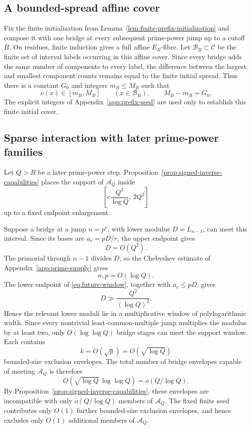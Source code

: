 \subsection{A bounded-spread affine cover}

Fix the finite initialization from Lemma~\ref{lem:finite-prefix-initialization} and compose it with one bridge at every subsequent prime-power jump up to a cutoff $B$.  On residues, finite induction gives a full affine $E_B$-fibre.  Let $\mathcal B_B\subset\mathcal C$ be the finite set of interval labels occurring in this affine cover.  Since every bridge adds the same number of components to every label, the difference between the largest and smallest component counts remains equal to the finite initial spread.  Thus there is a constant $G_0$ and integers $m_B\le M_B$ such that
\begin{equation}\label{eq:ragged-spread}
\nu(x)\in[m_B,M_B]
\qquad(x\in\mathcal B_B),
\qquad
M_B-m_B=G_0.
\end{equation}
The explicit integers of Appendix~\ref{app:prefix-seed} are used only to establish this finite initial cover.

\subsection{Sparse interaction with later prime-power families}

Let $Q>B$ be a later prime-power step.  Proposition~\ref{prop:signed-inverse-capabilities} places the support of $\mathcal A_Q$ inside
\begin{equation}\label{eq:future-window}
\left[c\frac{Q^2}{\log Q},\,2Q^2\right]
\end{equation}
up to a fixed endpoint enlargement.

Suppose a bridge at a jump $n=p^e$, with lower modulus $D=L_{n-1}$, can meet this interval.  Since its bases are $a_r=pD/r$, the upper endpoint gives
\[
D=O(Q^2).
\]
The primorial through $n-1$ divides $D$, so the Chebyshev estimate of Appendix~\ref{app:prime-supply} gives
\[
n,p=O(\log Q).
\]
The lower endpoint of \eqref{eq:future-window}, together with $a_r\le pD$, gives
\[
D\gg\frac{Q^2}{(\log Q)^2}.
\]
Hence the relevant lower moduli lie in a multiplicative window of polylogarithmic width.  Since every nontrivial least-common-multiple jump multiplies the modulus by at least two, only $O(\log\log Q)$ bridge stages can meet the support window.  Each contains
\[
k=O(\sqrt p)=O(\sqrt{\log Q})
\]
bounded-size exclusion envelopes.  The total number of bridge envelopes capable of meeting $\mathcal A_Q$ is therefore
\begin{equation}\label{eq:bridge-footprint}
O(\sqrt{\log Q}\,\log\log Q)
=o(Q/\log Q).
\end{equation}
By Proposition~\ref{prop:signed-inverse-capabilities}, these envelopes are incompatible with only $o(Q/\log Q)$ members of $\mathcal A_Q$.  The fixed finite seed contributes only $O(1)$ further bounded-size exclusion envelopes, and hence excludes only $O(1)$ additional members of $\mathcal A_Q$.

